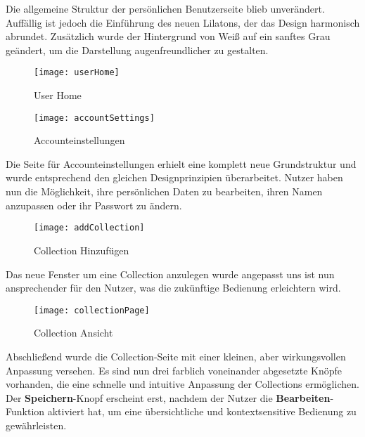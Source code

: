 Die allgemeine Struktur der persönlichen Benutzerseite blieb unverändert.
Auffällig ist jedoch die Einführung des neuen Lilatons, der das Design harmonisch abrundet.
Zusätzlich wurde der Hintergrund von Weiß auf ein sanftes Grau geändert, um die Darstellung augenfreundlicher zu gestalten.

\begin{figure}[h]
    \centering
    \texttt{[image: userHome]}
    \caption{User Home}
    \label{fig:userHome}
\end{figure}

\pagebreak

\begin{figure}[h]
    \centering
    \texttt{[image: accountSettings]}
    \caption{Accounteinstellungen}
    \label{fig:accountSettings}
\end{figure}

Die Seite für Accounteinstellungen erhielt eine komplett neue Grundstruktur und wurde entsprechend den gleichen Designprinzipien überarbeitet.
Nutzer haben nun die Möglichkeit, ihre persönlichen Daten zu bearbeiten, ihren Namen anzupassen oder ihr Passwort zu ändern.

\begin{figure}[h]
    \centering
    \texttt{[image: addCollection]}
    \caption{Collection Hinzufügen}
    \label{fig:addCollection}
\end{figure}

Das neue Fenster um eine Collection anzulegen wurde angepasst uns ist nun ansprechender für den Nutzer, was die zukünftige Bedienung erleichtern wird.
\pagebreak

\begin{figure}[h]
    \centering
    \texttt{[image: collectionPage]}
    \caption{Collection Ansicht}
    \label{fig:collectionPage}
\end{figure}

Abschließend wurde die Collection-Seite mit einer kleinen, aber wirkungsvollen Anpassung versehen.
Es sind nun drei farblich voneinander abgesetzte Knöpfe vorhanden, die eine schnelle und intuitive Anpassung der Collections ermöglichen.
Der \textbf{Speichern}-Knopf erscheint erst, nachdem der Nutzer die \textbf{Bearbeiten}-Funktion aktiviert hat, um eine übersichtliche und kontextsensitive Bedienung zu gewährleisten.
